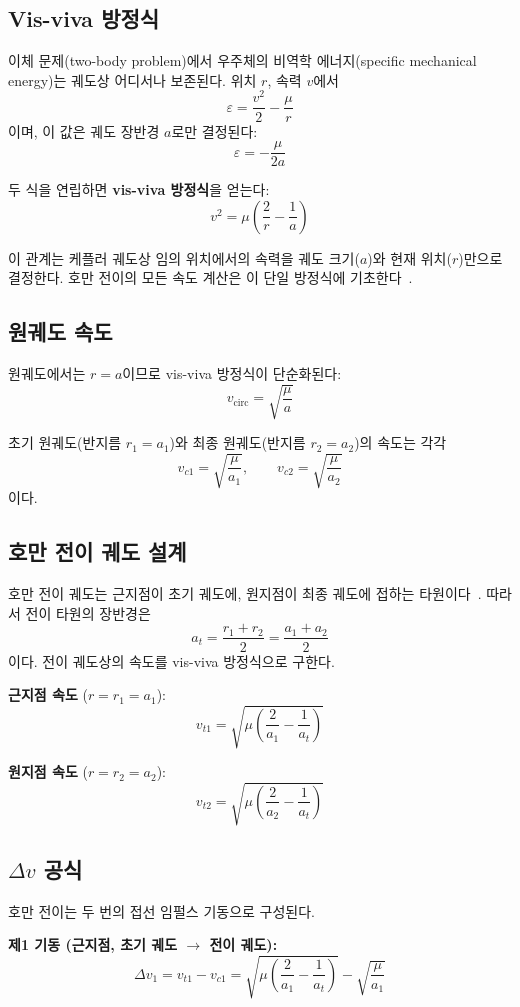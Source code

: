 \documentclass[11pt]{article}
\begin{document}
\subsection{Vis-viva 방정식}

이체 문제(two-body problem)에서 우주체의 비역학 에너지(specific mechanical energy)는 궤도상 어디서나 보존된다. 위치 $r$, 속력 $v$에서
\[
\varepsilon = \frac{v^2}{2} - \frac{\mu}{r}
\]
이며, 이 값은 궤도 장반경 $a$로만 결정된다:
\[
\varepsilon = -\frac{\mu}{2a}
\]

두 식을 연립하면 \textbf{vis-viva 방정식}을 얻는다:
\[
v^2 = \mu\left(\frac{2}{r} - \frac{1}{a}\right)
\]

이 관계는 케플러 궤도상 임의 위치에서의 속력을 궤도 크기($a$)와 현재 위치($r$)만으로 결정한다. 호만 전이의 모든 속도 계산은 이 단일 방정식에 기초한다~\cite{Curtis2020}.

\subsection{원궤도 속도}

원궤도에서는 $r = a$이므로 vis-viva 방정식이 단순화된다:
\[
v_{\text{circ}} = \sqrt{\frac{\mu}{a}}
\]

초기 원궤도(반지름 $r_1 = a_1$)와 최종 원궤도(반지름 $r_2 = a_2$)의 속도는 각각
\[
v_{c1} = \sqrt{\frac{\mu}{a_1}}, \qquad v_{c2} = \sqrt{\frac{\mu}{a_2}}
\]
이다.

\subsection{호만 전이 궤도 설계}

호만 전이 궤도는 근지점이 초기 궤도에, 원지점이 최종 궤도에 접하는 타원이다~\cite{Hohmann1960}. 따라서 전이 타원의 장반경은
\[
a_t = \frac{r_1 + r_2}{2} = \frac{a_1 + a_2}{2}
\]
이다. 전이 궤도상의 속도를 vis-viva 방정식으로 구한다.

\textbf{근지점 속도} ($r = r_1 = a_1$):
\[
v_{t1} = \sqrt{\mu\left(\frac{2}{a_1} - \frac{1}{a_t}\right)}
\]

\textbf{원지점 속도} ($r = r_2 = a_2$):
\[
v_{t2} = \sqrt{\mu\left(\frac{2}{a_2} - \frac{1}{a_t}\right)}
\]

\subsection{$\Delta v$ 공식}

호만 전이는 두 번의 접선 임펄스 기동으로 구성된다.

\textbf{제1 기동 (근지점, 초기 궤도 $\rightarrow$ 전이 궤도):}
\[
\Delta v_1 = v_{t1} - v_{c1} = \sqrt{\mu\left(\frac{2}{a_1} - \frac{1}{a_t}\right)} - \sqrt{\frac{\mu}{a_1}}
\]
\end{document}
